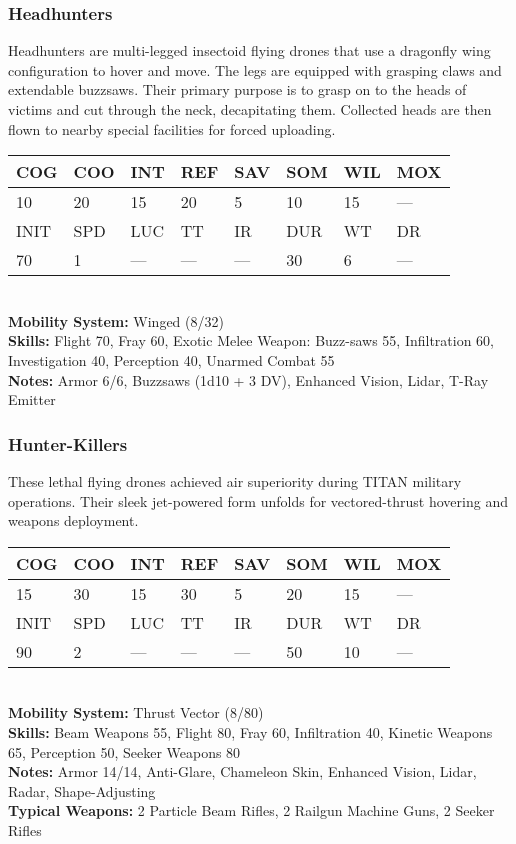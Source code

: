 \subsubsection{Headhunters}

Headhunters are multi-legged insectoid flying drones 
that use a dragonfly wing configuration to hover and 
move. The legs are equipped with grasping claws 
and extendable buzzsaws. Their primary purpose is 
to grasp on to the heads of victims and cut through 
the neck, decapitating them. Collected heads are then 
flown to nearby special facilities for forced uploading.
\\
\begin{tabular}{|l|l|l|l|l|l|l|l|}
\hline
COG & COO & INT & REF & SAV & SOM & WIL & MOX \\
\hline
10 & 20 & 15 & 20 & 5 & 10 & 15 & — \\
\hline
INIT & SPD & LUC & TT & IR & DUR & WT & DR \\
\hline
70 & 1 & — & — & — & 30 & 6 & — \\
\hline
\end{tabular}
\\
\textbf{Mobility System: }Winged (8/32)
\\
\textbf{Skills:} Flight 70, Fray 60, Exotic Melee Weapon: Buzz-saws 55, Infiltration 60, Investigation 40, Perception 40, Unarmed Combat 55
\\
\textbf{Notes:} Armor 6/6, Buzzsaws (1d10 + 3 DV), Enhanced Vision, Lidar, T-Ray Emitter

\subsubsection{Hunter-Killers}

These lethal flying drones achieved air superiority 
during TITAN military operations. Their sleek jet-powered
form unfolds for vectored-thrust hovering
and weapons deployment.
\\
\begin{tabular}{|l|l|l|l|l|l|l|l|}
\hline
COG & COO & INT & REF & SAV & SOM & WIL & MOX \\
\hline
15 & 30 & 15 & 30 & 5 & 20 & 15 & — \\
\hline
INIT & SPD & LUC & TT & IR & DUR & WT & DR \\
\hline
90 & 2 & — & — & — & 50 & 10 & — \\
\hline
\end{tabular}
\\
\textbf{Mobility System: }Thrust Vector (8/80)
\\
\textbf{Skills:} Beam Weapons 55, Flight 80, Fray 60, Infiltration 40, Kinetic Weapons 65, Perception 50, Seeker Weapons 80
\\
\textbf{Notes:} Armor 14/14, Anti-Glare, Chameleon Skin, Enhanced Vision, Lidar, Radar, Shape-Adjusting 
\\
\textbf{Typical Weapons:} 2 Particle Beam Rifles, 2 Railgun Machine Guns, 2 Seeker Rifles

